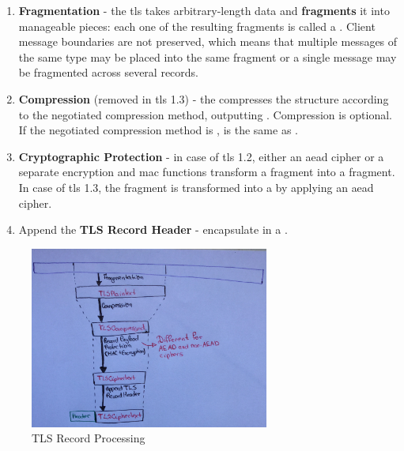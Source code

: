 \documentclass{llncs}
\begin{document}
\begin{enumerate}
  \item \textbf{Fragmentation} - the \gls{tls}  takes arbitrary-length data and \textbf{fragments}
  it into manageable pieces: each one of the resulting fragments is called a .
  Client message boundaries are not preserved, which means that multiple messages
  of the same type may be placed into the same fragment or a single message may
  be fragmented across several records.
  \item  \textbf{Compression} (removed in \gls{tls} 1.3) - the  compresses the
   structure according to the negotiated compression method,
  outputting . Compression is optional. If the negotiated compression
  method is ,  is the same as .
  \item \textbf{Cryptographic Protection} - in case of \gls{tls} 1.2, either an
  \gls{aead} cipher or a separate encryption and \gls{mac} functions transform a
   fragment into a  fragment. In case
  of \gls{tls} 1.3, the  fragment is transformed into a 
  by applying an \gls{aead} cipher.
  \item Append the \textbf{TLS Record Header} - encapsulate 
  in a .
\end{enumerate}

\begin{figure}
\centering
\includegraphics[width=0.7\textwidth]{img/tls-record-processing.jpg}
\caption{\label{fig:tls-record-processing}TLS Record Processing}
\end{figure}
\end{document}
